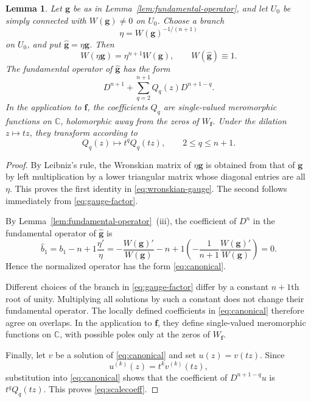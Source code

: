 \documentclass[12pt,letterpaper,reqno]{amsart}
\newtheorem{lem}[thm]{Lemma}
\theoremstyle{definition}
\numberwithin{equation}{section}
\newcommand{\C}{\mathbb C}
\newcommand{\fv}{\bm f}
\newcommand{\gv}{\bm g}
\begin{document}
\begin{lem}\label{lem:canonical-gauge}
Let \(\gv\) be as in Lemma~\ref{lem:fundamental-operator}, and let \(U_0\)
be simply connected with \(W(\gv)\ne0\) on \(U_0\). Choose a branch
\begin{equation}\label{eq:gauge-factor}
\eta=W(\gv)^{-1/(n+1)}
\end{equation}
on \(U_0\), and put \(\widehat{\gv}=\eta\gv\). Then
\begin{equation}\label{eq:wronskian-gauge}
W(\eta\gv)=\eta^{n+1}W(\gv),\qquad
W(\widehat{\gv})\equiv1.
\end{equation}
The fundamental operator of \(\widehat{\gv}\) has the form
\begin{equation}\label{eq:canonical}
D^{n+1}+\sum_{q=2}^{n+1}Q_q(z)D^{n+1-q}.
\end{equation}
In the application to \(\fv\), the coefficients \(Q_q\) are single-valued
meromorphic functions on \(\C\), holomorphic away from the zeros of
\(W_{\fv}\). Under the dilation \(z\mapsto tz\), they transform according to
\begin{equation}\label{eq:scalecoeff}
Q_q(z)\longmapsto t^qQ_q(tz),\qquad 2\le q\le n+1.
\end{equation}
\end{lem}

\begin{proof}
By Leibniz's rule, the Wronskian matrix of \(\eta\gv\) is obtained from that
of \(\gv\) by left multiplication by a lower triangular matrix whose
diagonal entries are all \(\eta\). This proves the first identity in
\eqref{eq:wronskian-gauge}. The second follows immediately from
\eqref{eq:gauge-factor}.

By Lemma~\ref{lem:fundamental-operator}~(iii), the coefficient of \(D^{n}\) in the fundamental
operator of \(\widehat{\gv}\) is
\[
\widehat b_1
=b_1-{n+1}\frac{\eta'}{\eta}
=-\frac{W(\gv)'}{W(\gv)}
-{n+1}\left(-\frac1{n+1}\frac{W(\gv)'}{W(\gv)}\right)
=0.
\]
Hence the normalized operator has the form \eqref{eq:canonical}.

Different choices of the branch in \eqref{eq:gauge-factor} differ by a
constant \({n+1}\)th root of unity. Multiplying all solutions by such a constant
does not change their fundamental operator. The locally defined coefficients
in \eqref{eq:canonical} therefore agree on overlaps. In the application to
\(\fv\), they define single-valued meromorphic functions on \(\C\), with
possible poles only at the zeros of \(W_{\fv}\).

Finally, let \(v\) be a solution of \eqref{eq:canonical} and set
\(u(z)=v(tz)\). Since
\[
 u^{(k)}(z)=t^k v^{(k)}(tz),
\]
substitution into \eqref{eq:canonical} shows that the coefficient of
\(D^{n+1-q}u\) is \(t^qQ_q(tz)\). This proves \eqref{eq:scalecoeff}.
\end{proof}
\end{document}
